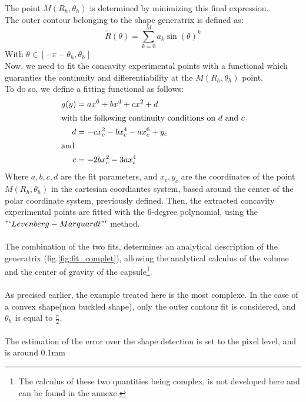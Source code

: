 The point $M(R_{h},\theta_h)$ is determined by minimizing this final expression.\\
The outer contour belonging to the shape generatrix is defined as:
\begin{equation*}
	\tilde{R}(\theta) = \sum\limits_{k=0}^M a_k \sin(\theta)^k
\end{equation*}
With $\theta \in[-\pi-\theta_h,\theta_h]$\\
Now, we need to fit the concavity experimental points with a functional which guaranties the continuity and differentiability at the $M(R_{h},\theta_h)$ point.\\
To do so, we define a fitting functional as follows:
\begin{align*}
g(y) &= a x^6+b x^4+ c x^2+ d\\
\intertext{with the following continuity conditions on $d$ and $c$}
d &= -c x_{c}^2 - b x_{c}^4 -ax_{c}^6+ y_c\\
\intertext{and}
c &= -2 b x_{c}^2-3 a x_{c}^4
\end{align*}
Where $a,b,c,d$ are the fit parameters, and $x_c,y_c$ are the coordinates of the point $M(R_{h},\theta_h)$ in the cartesian coordiantes system, based around the center of the polar coordinate system, previously defined. Then, the extracted concavity experimental points are fitted with the 6-degree polynomial, using the $"`Levenberg-Marquardt"'$ method. \\
\paragraph{}
The combination of the two fits, determines an analytical description of the generatrix (fig.\ref{fig:fit_complet}), allowing the analytical calculus of the volume and the center of gravity of the capsule\footnote{The calculus of these two quantities being complex, is not developed here and can be found in the annexe.}. 
\paragraph{}
As precised earlier, the example treated here is the most complexe. In the case of a convex shape(non buckled shape), only the outer contour fit is considered, and $\theta_h$ is equal to $\frac{\pi}{2}$.
\paragraph{}
The estimation of the error over the shape detection is set to the pixel level, and is around 0.1mm

